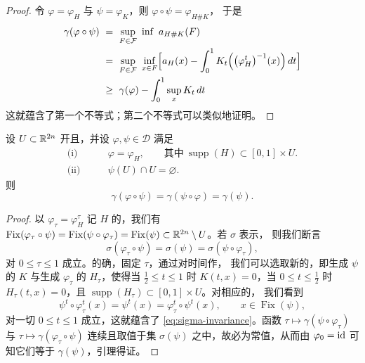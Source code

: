 \begin{proof}
令 $\varphi=\varphi_{H}$ 与 $\psi=\varphi_{K}$，则 $\varphi\circ\psi=\varphi_{H\#K}$，%
于是
\begin{align*}
\gamma(\varphi\circ\psi)\ &=\ \sup_{F\in\mathcal{F}}\ \inf\ a_{H\#K}(F)\\
&=\ \sup_{F\in\mathcal{F}}\ \inf_{x\in F}\Bigl[a_{H}(x)-\int_{0}^{1}K_{t}\Bigl(\bigl(\varphi_{H}^{t}\bigr)^{-1}(x)\Bigr)\,dt\Bigr]\\
&\geq\ \gamma(\varphi)-\int_{0}^{1}\sup_{x}K_{t}\,dt
\end{align*}
这就蕴含了第一个不等式；第二个不等式可以类似地证明。
\end{proof}

\begin{lemma}\label{lem:gamma-invariance-disjoint}
设 $U\subset\mathbb{R}^{2n}$ 开且\trBounded，并设 $\varphi,\psi\in\mathcal{D}$ 满足
\begin{align*}
\text{(i)}\qquad& \varphi=\varphi_{H},\qquad\text{其中}\ \operatorname{supp}(H)\subset[0,1]\times U.\\
\text{(ii)}\qquad& \psi(U)\cap U=\varnothing.
\end{align*}
则
\[
\gamma(\varphi\circ\psi)=\gamma(\psi\circ\varphi)=\gamma(\psi).
\]
\end{lemma}

\begin{proof}
以 $\varphi_{\tau}=\varphi_{H}^{\tau}$ 记 $H$ 的\trFlow，我们有%
$\operatorname{Fix}(\varphi_{\tau}\circ\psi)=\operatorname{Fix}(\psi\circ\varphi_{\tau})=%
\operatorname{Fix}(\psi)\subset\R^{2n}\setminus U$。若 $\sigma$ 表示\trActionSpectrum，%
则我们断言
\begin{equation}\label{eq:sigma-invariance}
\sigma(\varphi_{\tau}\circ\psi)=\sigma(\psi)=\sigma(\psi\circ\varphi_{\tau}),
\end{equation}
对 $0\leq\tau\leq1$ 成立。的确，固定 $\tau$，通过对时间作\trReparametrization，%
我们可以选取新的\trHamiltonianFunction，即生成 $\psi$ 的 $K$ 与生成 $\varphi_{\tau}$ 的%
$H_{\tau}$，使得当 $\frac{1}{2}\leq t\leq1$ 时 $K(t,x)=0$，当 $0\leq t\leq\frac{1}{2}$ 时%
$H_{\tau}(t,x)=0$，且 $\operatorname{supp}(H_{\tau})\subset[0,1]\times U$。对相应的\trFlow，%
我们看到
\[
\psi^{t}\circ\varphi_{\tau}^{t}(x)=\psi^{t}(x)=\varphi_{\tau}^{t}\circ\psi^{t}(x),%
\qquad x\in\operatorname{Fix}(\psi),
\]
对一切 $0\leq t\leq1$ 成立，这就蕴含了 \eqref{eq:sigma-invariance}。函数%
$\tau\mapsto\gamma(\psi\circ\varphi_{\tau})$ 与 $\tau\mapsto\gamma(\varphi_{\tau}\circ\psi)$%
连续且取值于\trNowhereDense{}集 $\sigma(\psi)$ 之中，故必为常值，从而由%
$\varphi_{0}=\mathrm{id}$ 可知它们等于 $\gamma(\psi)$，引理得证。
\end{proof}

